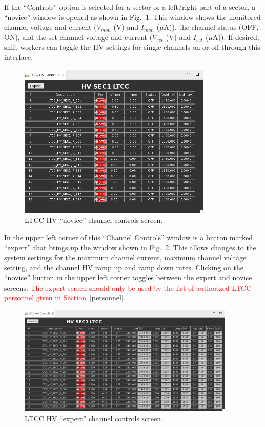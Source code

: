 \documentclass{article}
\begin{document}
If the ``Controls'' option is selected for a sector or a left/right part of a sector, a ``novice'' 
window is opened as shown in Fig.~\ref{fig:ltccHVcontrols}. This window shows the monitored channel voltage 
and current ($V_{mon}$ (V) and $I_{mon}$ ($\mu$A)), the channel status (OFF, ON), and the set channel
voltage and current ($V_{set}$ (V) and $I_{set}$ ($\mu$A)). If desired, shift workers can toggle the
HV settings for single channels on or off through this interface.


\begin{figure}[ht]
  \centering
		\includegraphics[width=0.82\textwidth]{img/ltccHVcontrols}
		\caption{LTCC HV “novice” channel controls screen. }
 		\label{fig:ltccHVcontrols}
\end{figure}

\clearpage

In the upper left corner of this ``Channel Controls'' window is a button marked ``expert'' that
brings up the window shown in Fig.~\ref{fig:hvcontrolsE}. This allows changes to the system settings
for the maximum channel current, maximum channel voltage setting, and the channel HV ramp up and 
ramp down rates. Clicking on the ``novice'' button in the upper left corner toggles between the 
expert and novice screens. \textcolor{red}{The expert screen should only be used by the list of 
authorized LTCC personnel given in Section~\ref{personnel}.} 

\begin{figure}[ht]
  \centering
		\includegraphics[width=0.92\textwidth]{img/ltccHVcontrolsExpert}
		\caption{LTCC HV  “expert” channel controls screen.}
 		\label{fig:hvcontrolsE}
\end{figure}
\end{document}
